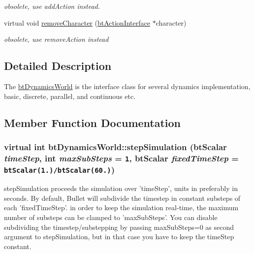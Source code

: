 \begin{CompactItemize}
\begin{CompactList}\small\item\em obsolete, use addAction instead. \item\end{CompactList}\item 
\hypertarget{classbt_dynamics_world_e4daeac0b98e39a80bb960c5b995fd2a}{
virtual void \hyperlink{classbt_dynamics_world_e4daeac0b98e39a80bb960c5b995fd2a}{removeCharacter} (\hyperlink{classbt_action_interface}{btActionInterface} $\ast$character)}
\label{classbt_dynamics_world_e4daeac0b98e39a80bb960c5b995fd2a}

\begin{CompactList}\small\item\em obsolete, use removeAction instead \item\end{CompactList}\end{CompactItemize}


\subsection{Detailed Description}
The \hyperlink{classbt_dynamics_world}{btDynamicsWorld} is the interface class for several dynamics implementation, basic, discrete, parallel, and continuous etc. 

\subsection{Member Function Documentation}
\hypertarget{classbt_dynamics_world_5ab26a0d6e8b2b21fbde2ed8f8dd6294}{
\subsubsection[stepSimulation]{\setlength{\rightskip}{0pt plus 5cm}virtual int btDynamicsWorld::stepSimulation (btScalar {\em timeStep}, \/  int {\em maxSubSteps} = {\tt 1}, \/  btScalar {\em fixedTimeStep} = {\tt btScalar(1.)/btScalar(60.)})}}
\label{classbt_dynamics_world_5ab26a0d6e8b2b21fbde2ed8f8dd6294}


stepSimulation proceeds the simulation over 'timeStep', units in preferably in seconds. By default, Bullet will subdivide the timestep in constant substeps of each 'fixedTimeStep'. in order to keep the simulation real-time, the maximum number of substeps can be clamped to 'maxSubSteps'. You can disable subdividing the timestep/substepping by passing maxSubSteps=0 as second argument to stepSimulation, but in that case you have to keep the timeStep constant. 

